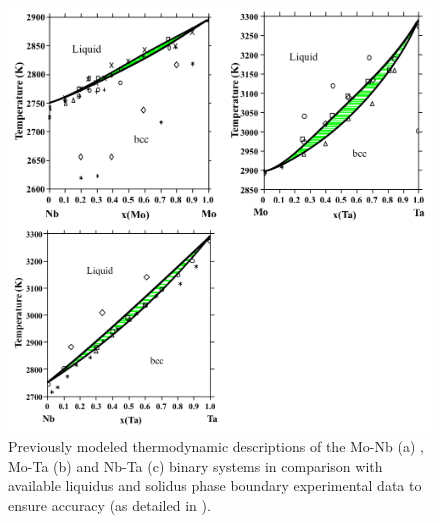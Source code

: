 \newpage
\begin{figure}[H]
	\centering
	\includegraphics[width=\textwidth]{Chapter-3/Figures/binary1.png}
	\caption{Previously modeled thermodynamic descriptions of the Mo-Nb (a) \cite{Xiong2004}, Mo-Ta (b) \cite{Xiong2004} and Nb-Ta (c) \cite{Xiong2004} binary systems in comparison with available liquidus and solidus phase boundary experimental data to ensure accuracy (as detailed in \cite{Xiong2004}). }
	\label{Ch3-figure:binary1}
\end{figure}

